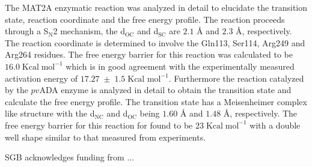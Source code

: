 \documentclass[journal=jpcbfk,manuscript=article,layout=traditional]{achemso}
\begin{document}
The MAT2A enzymatic reaction was analyzed in detail to elucidate the transition state,
reaction coordinate and the free energy profile. The reaction proceeds through a 
S$_\text{N}$2 mechanism, the d$_{\text{OC}}$ and d$_{\text{SC}}$ are $2.1$ {\AA}
and $2.3$ {\AA}, respectively. The reaction coordinate is determined to involve  
the Gln113, Ser114, Arg249 and Arg264 residues. 
The free energy barrier for this reaction was calculated to be 
$16.0\;\text{Kcal}\;\text{mol}^{-1}$ which is in good agreement 
with the experimentally measured activation energy of $17.27\;\pm\;1.5\;\text{Kcal mol}^{-1}$. 
Furthermore the reaction catalyzed by the $pv$ADA enzyme is analyzed in detail to obtain the  
transition state and calculate the free energy profile.
The transition state has a Meisenheimer complex like structure with the 
d$_\text{NC}$ and d$_\text{OC}$ being $1.60$ {\AA} and $1.48$ {\AA}, respectively.
The free energy barrier for this reaction for found to be $23\;\text{Kcal}\;\text{mol}^{-1}$
with a double well shape similar to that measured from experiments.  
\begin{acknowledgement}
SGB acknowledges funding from ...

\end{acknowledgement}

\begin{suppinfo}


\end{suppinfo}


\end{document}
